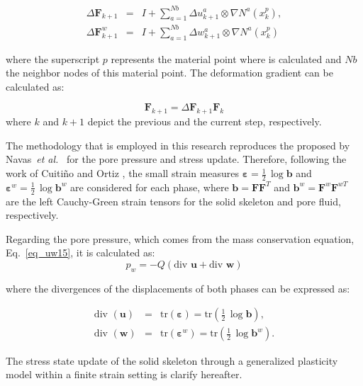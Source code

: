 \documentclass[preprint,12pt,a4paper]{elsarticle}
\begin{document}
\begin{eqnarray}
\Delta \mathbf{F}_{k+1} &=& I+\sum_{a=1}^{Nb}\Delta u_{k+1}^a \otimes \nabla N^a(x_{k}^p), \\
\Delta \mathbf{F}^w_{k+1} &=&I+\sum_{a=1}^{Nb}\Delta w_{k+1}^a \otimes \nabla N^a(x_{k}^p)
\end{eqnarray}

where the superscript $p$ represents the material point where is calculated and $Nb$ the neighbor nodes of this material point. The deformation gradient can be calculated as:

\begin{equation}
\mathbf{F}_{k+1} = \Delta \mathbf{F}_{k+1} \mathbf{F}_{k} 
\end{equation}
where $k$ and $k+1$ depict the previous and the current step, respectively.

The methodology that is employed in this research reproduces the proposed by Navas~\textit{et al.}~\cite{Navas:17c} for the pore pressure and stress update. Therefore, following the work of Cuiti\~no and Ortiz \cite{cuitino:92}, the small strain measures $\boldsymbol{\varepsilon} = \frac{1}{2}\,\log\mathbf{b}$ and $\boldsymbol{\varepsilon}^w = \frac{1}{2}\,\log\mathbf{b}^w$ are considered for each phase, where $\mathbf{b}=\mathbf{F}\mathbf{F}^T$ and $\mathbf{b}^w=\mathbf{F}^w\mathbf{F}^{wT}$ are the left Cauchy-Green strain tensors for the solid skeleton and pore fluid, respectively.

Regarding the pore pressure, which comes from the mass conservation equation, Eq.~\eqref{eq_uw15}, it is calculated as:
\begin{equation}
p_w = -Q \left( \mbox{div } \boldsymbol{u} + \mbox{div } \boldsymbol{w} \right) 
\end{equation}

where the divergences of the displacements of both phases can be expressed as:

\begin{eqnarray}
\mbox{div }(\boldsymbol{u}) &=& \mbox{tr}(\boldsymbol{\varepsilon})=\mbox{tr} \left (\frac{1}{2}\,\log\mathbf{b} \right), \\
\mbox{div }(\boldsymbol{w}) &=& \mbox{tr} (\boldsymbol{\varepsilon}^w)=\mbox{tr} \left(\frac{1}{2}\,\log\mathbf{b}^w \right).
\end{eqnarray}

The stress state update of the solid skeleton through a generalized plasticity model within a finite strain setting is clarify hereafter. 
\end{document}
